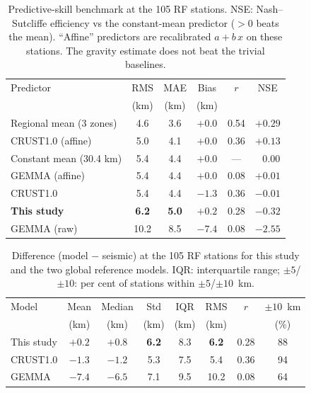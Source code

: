 \documentclass[extra,mreferee]{gji}
\begin{document}
\begin{table}
\caption{Predictive-skill benchmark at the 105 RF stations. NSE: Nash--Sutcliffe
efficiency vs the constant-mean predictor (${>}0$ beats the mean). ``Affine''
predictors are recalibrated $a+b\,x$ on these stations. The gravity estimate does
not beat the trivial baselines.}
\label{tab:skill}
\begin{tabular}{lccccc}
\hline
Predictor & RMS & MAE & Bias & $r$ & NSE\\
          & (km)& (km)& (km) &     & \\
\hline
Regional mean (3 zones)   & 4.6 & 3.6 & $+0.0$ & 0.54 & $+0.29$\\
CRUST1.0 (affine)         & 5.0 & 4.1 & $+0.0$ & 0.36 & $+0.13$\\
Constant mean (30.4 km)   & 5.4 & 4.4 & $+0.0$ & ---  & $\;\;\,0.00$\\
GEMMA (affine)            & 5.4 & 4.4 & $+0.0$ & 0.08 & $+0.01$\\
CRUST1.0                  & 5.4 & 4.4 & $-1.3$ & 0.36 & $-0.01$\\
\textbf{This study}       & \textbf{6.2} & \textbf{5.0} & $+0.2$ & 0.28 & $\mathbf{-0.32}$\\
GEMMA (raw)               & 10.2& 8.5 & $-7.4$ & 0.08 & $-2.55$\\
\hline
\end{tabular}
\end{table}

\begin{table}
\caption{Difference (model $-$ seismic) at the 105 RF stations for this study and
the two global reference models. IQR: interquartile range; $\pm5$/$\pm10$: per cent
of stations within $\pm5$/$\pm10$~km.}
\label{tab:compare}
\begin{tabular}{lccccccc}
\hline
Model & Mean & Median & Std & IQR & RMS & $r$ & $\pm10$~km\\
      & (km) & (km)   & (km)& (km)& (km)&     & (\%)\\
\hline
This study & $+0.2$ & $+0.8$ & \textbf{6.2} & 8.3 & \textbf{6.2} & 0.28 & 88\\
{CRUST1.0} & $-1.3$ & $-1.2$ & 5.3 & 7.5 & 5.4 & 0.36 & 94\\
{GEMMA}    & $-7.4$ & $-6.5$ & 7.1 & 9.5 & 10.2 & 0.08 & 64\\
\hline
\end{tabular}
\end{table}

\end{document}
